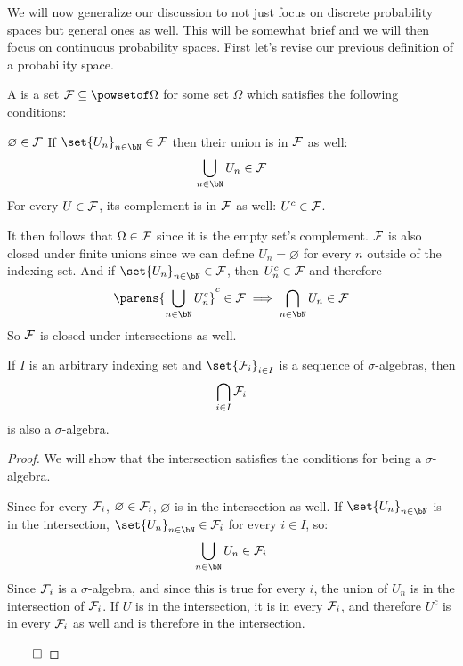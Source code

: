 We will now generalize our discussion to not just focus on discrete probability spaces but general ones as well.
This will be somewhat brief and we will then focus on continuous probability spaces.
First let's revise our previous definition of a probability space.

\begin{defn*}

	A  is a set $\cF\subseteq\powsetof\Omega$ for some set $\Omega$ which satisfies the
	following conditions:
	\begin{msecenumerate}
		\mitem $\varnothing\in{\cal F}$
		\mitem If $\set{U_n}_{n\in\bN}\in\cF$ then their union is in ${\cal F}$ as well:
		\[ \bigcup_{n\in\bN}U_n\in\cF \]
		\mitem For every $U\in{\cal F}$, its complement is in ${\cal F}$ as well: $U^c\in{\cal F}$.
	\end{msecenumerate}

\end{defn*}

It then follows that $\Omega\in{\cal F}$ since it is the empty set's complement.
${\cal F}$ is also closed under finite unions since we can define $U_n=\varnothing$ for every $n$ outside of the indexing
set.
And if $\set{U_n}_{n\in\bN}\in\cF$, then $U_n^c\in{\cal F}$ and therefore
\[ \parens{\bigcup_{n\in\bN}U_n^c}^c\in\cF \implies \bigcap_{n\in\bN}U_n\in\cF \]
So ${\cal F}$ is closed under intersections as well.

\begin{prop*}

	If $I$ is an arbitrary indexing set and $\set{\cF_i}_{i\in I}$ is a sequence of $\sigma$-algebras, then
	\[ \bigcap_{i\in I}{\cal F}_i \]
	is also a $\sigma$-algebra.

\end{prop*}

\begin{proof}

	We will show that the intersection satisfies the conditions for being a $\sigma$-algebra.

	\begin{msecenumerate}[0pt]
		\mitem Since for every ${\cal F}_i$, $\varnothing\in{\cal F}_i$, $\varnothing$ is in the intersection as well.
		\mitem If $\set{U_n}_{n\in\bN}$ is in the intersection, $\set{U_n}_{n\in\bN}\in\cF_i$ for every $i\in I$, so:
		\[ \bigcup_{n\in\bN}U_n\in\cF_i \]
		Since ${\cal F}_i$ is a $\sigma$-algebra, and since this is true for every $i$, the union of $U_n$ is in the
		intersection of ${\cal F}_i$.
		\mitem If $U$ is in the intersection, it is in every ${\cal F}_i$, and therefore $U^c$ is in every ${\cal F}_i$ as well
		and is therefore in the intersection.
	\end{msecenumerate} 

	\hfill$\qed$

\end{proof}

